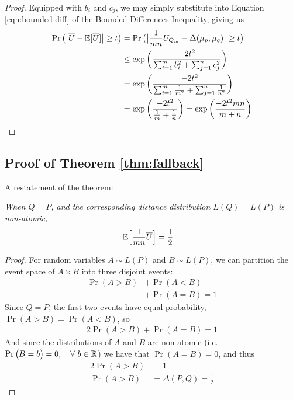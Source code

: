 \begin{proof}
Equipped with $b_i$ and $c_j$, we may simply substitute into Equation \ref{eqn:bounded diff} of the Bounded Differences Inequality, giving us 
\begin{align*}
	\Pr\big(\big|  \overline{U}- {\mathbb E}[\overline{U}]\big| \geq t\big) 
	&=  \Pr\big(\big|  \frac{1}{mn} U_{Q_m} - \Delta(\mu_p, \mu_q)\big| \geq t\big)\\
	&\leq \exp\bigg( \frac{-2t^2}{ \sum_{i=1}^m b_i^2 + \sum_{j=1}^n c_j^2} \bigg) \\
	&= \exp\bigg( \frac{-2t^2}{ \sum_{i=1}^m \frac{1}{m^2} + \sum_{j=1}^n \frac{1}{n^2} } \bigg) \\
	&= \exp\bigg( \frac{-2t^2}{ \frac{1}{m} + \frac{1}{n} } \bigg) 
	= \exp\bigg( \frac{-2t^2mn}{ m+n } \bigg)
\end{align*}
\end{proof}

\subsection{Proof of Theorem \ref{thm:fallback}}
\label{sec:proof fallback}
A restatement of the theorem: 

\textit{
When $Q = P$, and the corresponding distance distribution $L(Q) = L(P)$ is non-atomic, 
    \begin{align*}
         {\mathbb E} \Big[ \frac{1}{mn}\overline{U} \Big] &= \frac{1}{2}
    \end{align*}
}
\begin{proof}
	For random variables $A \sim L(P)$ and $B \sim L(P)$, we can partition the event space of $A \times B$ into three disjoint events: 
	\begin{align*}
		\Pr(A > B) &+ \Pr(A < B) \\
		&+ \Pr(A = B) = 1
	\end{align*}
	Since $Q = P$, the first two events have equal probability, $\Pr(A > B) = \Pr(A < B)$, so 
	\begin{align*}
		2\Pr(A > B) + \Pr(A = B) = 1
	\end{align*}
	And since the distributions of $A$ and $B$ are non-atomic (i.e. $\Pr\big(B = b\big) = 0, \quad \forall \ b \in {\mathbb R}$) we have that $\Pr(A = B) = 0$, and thus 
	\begin{align*}
		2\Pr(A > B) &= 1 \\
		\Pr(A > B) &= \Delta(P, Q) =  \frac{1}{2}
	\end{align*}
\end{proof}

